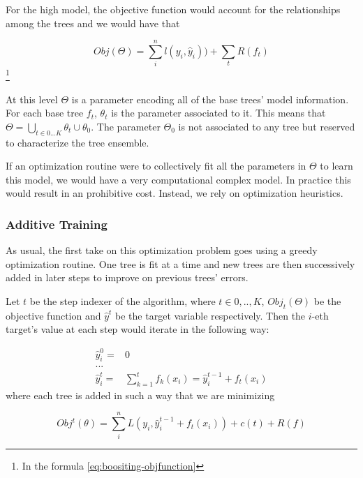 For the high model, the objective function would account for the relationships among the trees and we would have that

\begin{equation} 
Obj(\Theta) = \sum_i^n l(y_i,\hat{y}_i))  +  \sum_t R(f_t) 
\end{equation} \label{eq:boositing-objfunction} \footnote{In the formula \ref{eq:boositing-objfunction} }

At this level $\Theta$ is a parameter encoding all of the base trees' model information. For each base tree $f_t$, $\theta_t$ is the parameter associated to it. This means that $\Theta =  \bigcup_{t \in {0...K}} \theta_t  \cup \theta_0$.  The parameter $\Theta_0$ is not associated to any tree but reserved to characterize the tree ensemble.

If an optimization routine were to collectively fit all the parameters in $\Theta$ to learn this model, we would have a very computational complex model. In practice this would result in an prohibitive cost. Instead, we rely on optimization heuristics.

\subsubsection{Additive Training}

As usual, the first take on this optimization problem goes using a greedy optimization routine. One tree is fit at a time and new trees are then successively added in later steps to improve on previous trees' errors.

Let $t$ be the step indexer of the algorithm, where $t \in {0,..,K}$, $Obj_t(\Theta)$ be the objective function and $\hat{y}^t$ be the target variable respectively. Then the $i$-eth target's value at each step would iterate in the following way:

\begin{equation} \label{eq:gb-targetSteps}
\begin{split}
\hat{y}_i^0 = & 0 \\
... \\
\hat{y}_i^t = &\sum_{k=1}^{t} f_k(x_i) = \hat{y}^{t-1}_i +  f_t(x_i)
\end{split}
\end{equation}
where each tree is added in such a way that we are minimizing

\begin{equation}
Obj^t(\theta) =  \sum_i^n L(y_i, \hat{y}^{t-1}_i +  f_t(x_i) ) + c(t) + R(f)
\end{equation}


